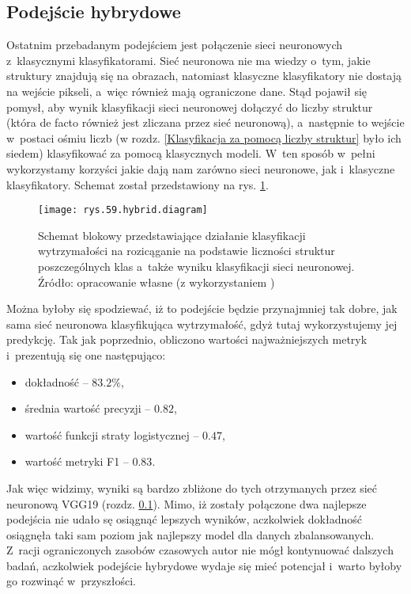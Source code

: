 \subsection{Podejście hybrydowe}
\label{binary.ann.with.structures}

Ostatnim przebadanym podejściem jest połączenie sieci neuronowych z~klasycznymi klasyfikatorami. Sieć neuronowa nie ma wiedzy o~tym, jakie struktury znajdują się na obrazach, natomiast klasyczne klasyfikatory nie dostają na wejście pikseli, a~więc również mają ograniczone dane. Stąd pojawił się pomysł, aby wynik klasyfikacji sieci neuronowej dołączyć do liczby struktur (która de facto również jest zliczana przez sieć neuronową), a~następnie to wejście w~postaci ośmiu liczb (w rozdz. \ref{Klasyfikacja za pomocą liczby struktur} było ich siedem) klasyfikować za pomocą klasycznych modeli. W~ten sposób w~pełni wykorzystamy korzyści jakie dają nam zarówno sieci neuronowe, jak i~klasyczne klasyfikatory. Schemat został przedstawiony na rys. \ref{rys.59.hybrid.diagram}. 
\begin{figure}[!h]
    \centering
    \texttt{[image: rys.59.hybrid.diagram]}
    \caption{Schemat blokowy przedstawiające działanie klasyfikacji wytrzymałości na rozicąganie na podstawie liczności struktur poszczególnych klas a~także wyniku klasyfikacji sieci neuronowej. Źródło: opracowanie własne (z wykorzystaniem )}
    \label{rys.59.hybrid.diagram}
\end{figure}
Można byłoby się spodziewać, iż to podejście będzie przynajmniej tak dobre, jak sama sieć neuronowa klasyfikująca wytrzymałość, gdyż tutaj wykorzystujemy jej predykcję. Tak jak poprzednio, obliczono wartości najważniejszych metryk i~prezentują się one następująco:
\begin{itemize}
	\item dokładność – $83.2\%$,
	\item średnia wartość precyzji – $0.82$,
	\item wartość funkcji straty logistycznej – $0.47$,
	\item wartość metryki F1 – $0.83$.
\end{itemize}
Jak więc widzimy, wyniki są bardzo zbliżone do tych otrzymanych przez sieć neuronową VGG19 (rozdz. \ref{binary.ann.with.structures}). Mimo, iż zostały połączone dwa najlepsze podejścia nie udało sę osiągnąć lepszych wyników, aczkolwiek dokładność osiągnęła taki sam poziom jak najlepszy model dla danych zbalansowanych. Z~racji ograniczonych zasobów czasowych autor nie mógł kontynuować dalszych badań, aczkolwiek podejście hybrydowe wydaje się mieć potencjał i~warto byłoby go rozwinąć w~przyszłości.
